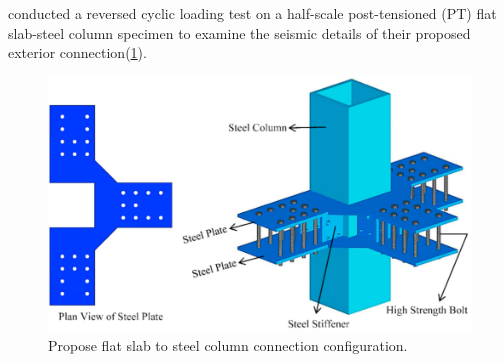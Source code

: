 \cite{rafiee2021} conducted a reversed cyclic loading test on a half-scale post-tensioned (PT) flat slab-steel column specimen to examine the seismic details of their proposed exterior connection(\ref{r2021f2}).
\begin{figure}\centering
    \includegraphics[width=\columnwidth]{Figures/r2021f2.png}
    \caption{Propose flat slab to steel column connection configuration\citep{rafiee2021}.}
    \label{r2021f2}
    \end{figure}

